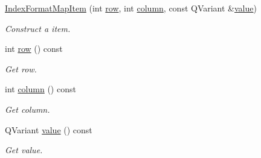 \begin{DoxyCompactItemize}
\item 
\hyperlink{class_mdt_1_1_item_model_1_1_index_format_map_item_a28af2012b771309104c48c5a73d0513a}{Index\+Format\+Map\+Item} (int \hyperlink{class_mdt_1_1_item_model_1_1_index_format_map_item_a866d655be8e13a8589d7d2d420e2dc27}{row}, int \hyperlink{class_mdt_1_1_item_model_1_1_index_format_map_item_ae1c6972b9ed7bba2e462a23cc81df6ae}{column}, const Q\+Variant \&\hyperlink{class_mdt_1_1_item_model_1_1_index_format_map_item_ad3c2c48927aa9243b246ad5c41030679}{value})
\begin{DoxyCompactList}\small\item\em Construct a item. \end{DoxyCompactList}\item 
int \hyperlink{class_mdt_1_1_item_model_1_1_index_format_map_item_a866d655be8e13a8589d7d2d420e2dc27}{row} () const \hypertarget{class_mdt_1_1_item_model_1_1_index_format_map_item_a866d655be8e13a8589d7d2d420e2dc27}{}\label{class_mdt_1_1_item_model_1_1_index_format_map_item_a866d655be8e13a8589d7d2d420e2dc27}

\begin{DoxyCompactList}\small\item\em Get row. \end{DoxyCompactList}\item 
int \hyperlink{class_mdt_1_1_item_model_1_1_index_format_map_item_ae1c6972b9ed7bba2e462a23cc81df6ae}{column} () const \hypertarget{class_mdt_1_1_item_model_1_1_index_format_map_item_ae1c6972b9ed7bba2e462a23cc81df6ae}{}\label{class_mdt_1_1_item_model_1_1_index_format_map_item_ae1c6972b9ed7bba2e462a23cc81df6ae}

\begin{DoxyCompactList}\small\item\em Get column. \end{DoxyCompactList}\item 
Q\+Variant \hyperlink{class_mdt_1_1_item_model_1_1_index_format_map_item_ad3c2c48927aa9243b246ad5c41030679}{value} () const \hypertarget{class_mdt_1_1_item_model_1_1_index_format_map_item_ad3c2c48927aa9243b246ad5c41030679}{}\label{class_mdt_1_1_item_model_1_1_index_format_map_item_ad3c2c48927aa9243b246ad5c41030679}

\begin{DoxyCompactList}\small\item\em Get value. \end{DoxyCompactList}\end{DoxyCompactItemize}



